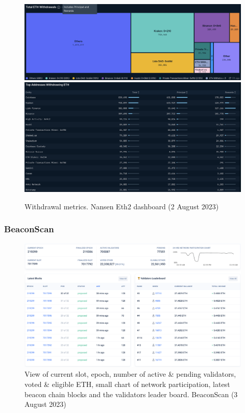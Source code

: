 \documentclass[UTF8]{article}
\begin{document}
\begin{figure}[htbp]
\begin{center}
\includegraphics[width=\linewidth]{images/nansen13}\\
\includegraphics[width=\linewidth]{images/nansen14}
\caption{Withdrawal metrics. Nansen Eth2 dashboard (2 August 2023)}
\label{fig:nansen13}
\end{center}
\end{figure}

\clearpage

\subsubsection*{BeaconScan}
\begin{figure}[htbp]
\begin{center}
\includegraphics[width=\linewidth]{images/beaconscan1}
\caption{View of current slot, epoch, number of active \& pending validators, voted \& eligible ETH, small chart of network participation, latest beacon chain blocks and the validators leader board. BeaconScan (3 August 2023)}
\label{fig:beaconscan1}
\end{center}
\end{figure}
\end{document}
